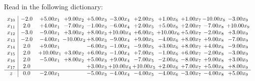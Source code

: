\documentclass[9pt]{article}
\begin{document}
Read in the following dictionary:
\[\begin{array}{c| c c@{\hskip 2pt} c@{\hskip 2pt} c@{\hskip 2pt} c@{\hskip 2pt} c@{\hskip 2pt} c@{\hskip 2pt} c@{\hskip 2pt} c@{\hskip 2pt} c@{\hskip 2pt} }
 x_{10}   &  -2.0 & +  5.00 x_{1} & +  9.00 x_{2} & +  5.00 x_{3} & -3.00 x_{4} & +  2.00 x_{5} & +  1.00 x_{6} & +  1.00 x_{7} & -10.00 x_{8} & -3.00 x_{9}\\
 x_{11}   &  2.0 & +  4.00 x_{1} & -7.00 x_{2} & -1.00 x_{3} & -6.00 x_{4} & +  2.00 x_{5} & +  5.00 x_{6} & +  2.00 x_{7} & -7.00 x_{8} & + 10.00 x_{9}\\
 x_{12}   &  -3.0 & -9.00 x_{1} & +  3.00 x_{2} & +  8.00 x_{3} & + 10.00 x_{4} & +  6.00 x_{5} & + 10.00 x_{6} & +  5.00 x_{7} & -2.00 x_{8} & +  3.00 x_{9}\\
 x_{13}   &  -2.0 & -4.00 x_{1} & -10.00 x_{2} & +  8.00 x_{3} & -9.00 x_{4} & +  9.00 x_{5} & -4.00 x_{6} & +  8.00 x_{7} & +  9.00 x_{8} & -7.00 x_{9}\\
 x_{14}   &  2.0 & +  9.00 x_{1} &   & -6.00 x_{3} & -1.00 x_{4} & -9.00 x_{5} & +  3.00 x_{6} & +  8.00 x_{7} & +  4.00 x_{8} & -9.00 x_{9}\\
 x_{15}   &  2.0 & + 10.00 x_{1} & +  3.00 x_{2} & +  6.00 x_{3} & -1.00 x_{4} & +  7.00 x_{5} & -1.00 x_{6} & +  6.00 x_{7} & -2.00 x_{8} & -3.00 x_{9}\\
 x_{16}   &  2.0 & -5.00 x_{1} & +  8.00 x_{2} & +  5.00 x_{3} & +  9.00 x_{4} & -7.00 x_{5} & -2.00 x_{6} & -8.00 x_{7} & +  9.00 x_{8} & +  3.00 x_{9}\\
 x_{17}   &  2.0  &    &   & +  3.00 x_{3} & + 10.00 x_{4} & + 10.00 x_{5} & +  2.00 x_{6} & +  7.00 x_{7} & +  5.00 x_{8} & +  8.00 x_{9}\\
\hline
z    &  0.0 & -2.00 x_{1} &   & -5.00 x_{3} & -4.00 x_{4} & -4.00 x_{5} & -4.00 x_{6} & -3.00 x_{7} & -4.00 x_{8} & +  5.00 x_{9}\\
\end{array}\]
\end{document}
